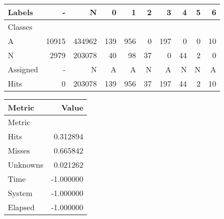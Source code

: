 \begin{tabular}{l|r|r|r|r|r|r|r|r|r}

Labels &      - &       N &    0 &    1 &   2 &    3 &   4 &  5 &   6 \\\hline
Classes  &        &         &      &      &     &      &     &    &     \\\hline
\hline
A        &  10915 &  434962 &  139 &  956 &   0 &  197 &   0 &  0 &  10 \\\hline
N        &   2979 &  203078 &   40 &   98 &  37 &    0 &  44 &  2 &   0 \\\hline
\hline
Assigned &      - &       N &    A &    A &   N &    A &   N &  N &   A \\\hline
Hits     &      0 &  203078 &  139 &  956 &  37 &  197 &  44 &  2 &  10 
\end{tabular}
\begin{tabular}{l|r}

Metric   &     Value \\\hline
Metric   &           \\\hline
\hline
Hits     &  0.312894 \\\hline
Misses   &  0.665842 \\\hline
Unknowns &  0.021262 \\\hline
Time     & -1.000000 \\\hline
System   & -1.000000 \\\hline
Elapsed  & -1.000000 
\end{tabular}
